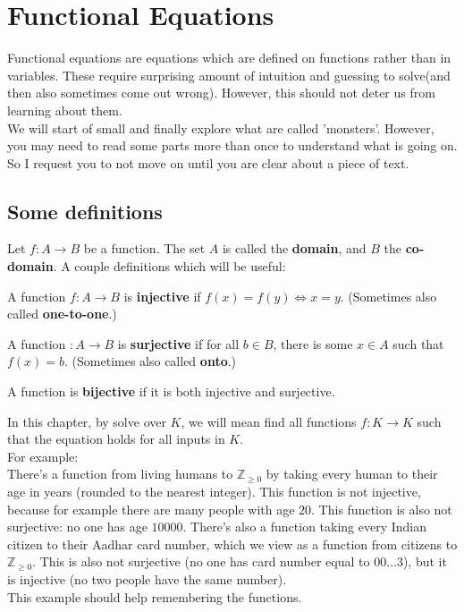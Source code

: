 
\chapter{Functional Equations}
Functional equations are equations which are defined on functions rather than in variables. These require surprising amount of intuition and guessing to solve(and then also sometimes come out wrong). However, this should not deter us from learning about them.\\
We will start of small and finally explore what are called 'monsters'. However, you may need to read some parts more than once to understand what is going on. So I request you to not move on until you are clear about a piece of text.\\
\section{Some definitions}
Let $f : A \to B$ be a function.
The set $A$ is called the \textbf{domain}, and $B$ the \textbf{co-domain}.
A couple definitions which will be useful:
\begin{definition}
	A function $f : A \to B$ is \textbf{injective} if $f(x) = f(y) \iff x=y$.
	(Sometimes also called \textbf{one-to-one}.)
\end{definition}
\begin{definition}
	A function $ : A \to B$ is \textbf{surjective} if for all $b \in B$,
	there is some $x \in A$ such that $f(x) = b$.
	(Sometimes also called \textbf{onto}.)
\end{definition}
\begin{definition}
	A function is \textbf{bijective} if it is both injective and surjective.
\end{definition}
In this chapter, by solve over $K$, we will mean find all functions $f : K \to K$ such that the equation holds for all inputs in $K$.\\
For example: \\
There’s a function from living humans to $\mathbb{Z}_{\geq 0}$ by taking every human to their age in years (rounded to the nearest integer). This function is not injective, because for example there are many people with age $20$. This function is also not surjective: no one has age $10000$.
There’s also a function taking every Indian citizen to their Aadhar card number, which we view as a function from citizens to $\mathbb{Z}_{\geq 0}$. This is also not surjective (no one has card number equal to $00\dots 3$), but it is injective (no two people have the same number).\\
This example should help remembering the functions.\\
